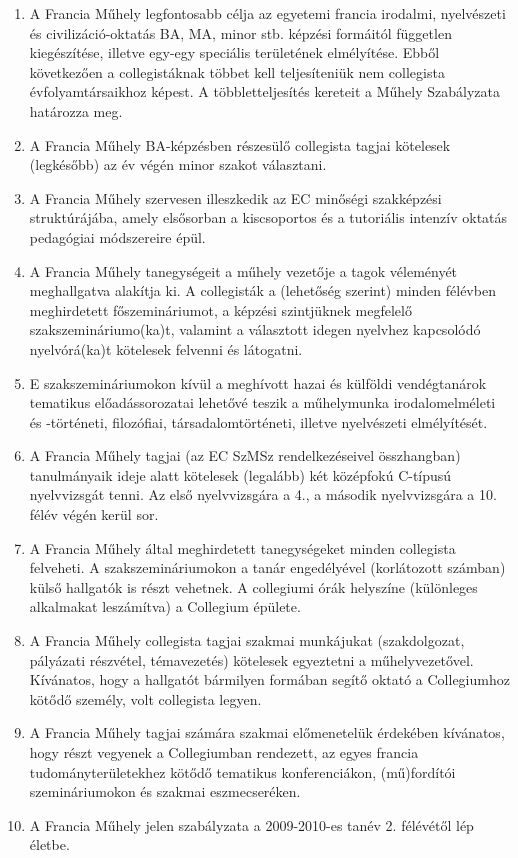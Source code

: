 \documentclass{../styles/rulebook}
\begin{document}
\begin{enumerate}
	\item A Francia Műhely legfontosabb célja az egyetemi francia irodalmi, nyelvészeti és civilizáció-oktatás BA, MA, minor stb. képzési formáitól független kiegészítése, illetve egy-egy speciális területének elmélyítése. Ebből következően a collegistáknak többet kell teljesíteniük nem collegista évfolyamtársaikhoz képest. A többletteljesítés kereteit a Műhely Szabályzata határozza meg.
	\item A Francia Műhely BA-képzésben részesülő collegista tagjai kötelesek (legkésőbb) az év végén minor szakot választani.
	\item A Francia Műhely szervesen illeszkedik az EC minőségi szakképzési struktúrájába, amely elsősorban a kiscsoportos és a tutoriális intenzív oktatás pedagógiai módszereire épül.
	\item A Francia Műhely tanegységeit a műhely vezetője a tagok véleményét meghallgatva alakítja ki. A collegisták a (lehetőség szerint) minden félévben meghirdetett főszemináriumot, a képzési szintjüknek megfelelő szakszemináriumo(ka)t, valamint a választott idegen nyelvhez kapcsolódó nyelvórá(ka)t kötelesek felvenni és látogatni.
	\item E szakszemináriumokon kívül a meghívott hazai és külföldi vendégtanárok tematikus előadássorozatai lehetővé teszik a műhelymunka irodalomelméleti és -történeti, filozófiai, társadalomtörténeti, illetve nyelvészeti elmélyítését.
	\item A Francia Műhely tagjai (az EC SzMSz rendelkezéseivel összhangban) tanulmányaik ideje alatt kötelesek (legalább) két középfokú C-típusú nyelvvizsgát tenni. Az első nyelvvizsgára a 4., a második nyelvvizsgára a 10. félév végén kerül sor.
	\item A Francia Műhely által meghirdetett tanegységeket minden collegista felveheti. A szakszemináriumokon a tanár engedélyével (korlátozott számban) külső hallgatók is részt vehetnek. A collegiumi órák helyszíne (különleges alkalmakat leszámítva) a Collegium épülete.
	\item A Francia Műhely collegista tagjai szakmai munkájukat (szakdolgozat, pályázati részvétel, témavezetés) kötelesek egyeztetni a műhelyvezetővel. Kívánatos, hogy a hallgatót bármilyen formában segítő oktató a Collegiumhoz kötődő személy, volt collegista legyen.
	\item A Francia Műhely tagjai számára szakmai előmenetelük érdekében kívánatos, hogy részt vegyenek a Collegiumban rendezett, az egyes francia tudományterületekhez kötődő tematikus konferenciákon, (mű)fordítói szemináriumokon és szakmai eszmecseréken.
	\item A Francia Műhely jelen szabályzata a 2009-2010-es tanév 2. félévétől lép életbe.
\end{enumerate}
\end{document}

